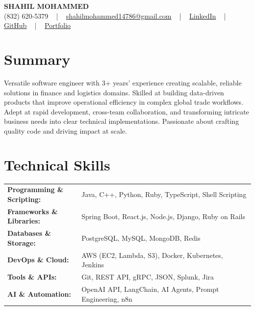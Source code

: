 \documentclass[letterpaper,11pt]{article}
\begin{document}
\begin{center}
    {\fontsize{14pt}{12pt}\selectfont \textbf{\MakeUppercase{Shahil Mohammed}}}\\ \vspace{2pt}
    \fontsize{10pt}{12pt}\selectfont (832) 620-5379 ~ | ~ \href{mailto:shahilmohammed14786@gmail.com}{shahilmohammed14786@gmail.com} ~ | ~  
    \href{https://www.linkedin.com/in/shahil-mohammed-9652931a1/}{\color{blue}\underline{LinkedIn}}  ~ | ~ 
    \href{https://github.com/freakbeast14}{\color{blue}\underline{GitHub}} ~ | ~ 
    \href{https://shahil-mohammed.netlify.app/}{\color{blue}\underline{Portfolio}}
    \vspace{-8pt}
\end{center}

\section{Summary}
\fontsize{9pt}{10pt}\selectfont
Versatile software engineer with 3+ years’ experience creating scalable, reliable solutions in finance and logistics domains. Skilled at building data-driven products that improve operational efficiency in complex global trade workflows. Adept at rapid development, cross-team collaboration, and transforming intricate business needs into clear technical implementations. Passionate about crafting quality code and driving impact at scale.

 \vspace{-5pt}
 
\section{Technical Skills}
        \vspace{-14pt}
        \begin{table}[h]
            \fontsize{9pt}{10pt}\selectfont
            \begin{tabular}{p{0.3\linewidth} p{0.7\linewidth}}
                \textbf{Programming \& Scripting:} & Java, C++, Python, Ruby, TypeScript, Shell Scripting \\
                \textbf{Frameworks \& Libraries:} & Spring Boot, React.js, Node.js, Django, Ruby on Rails \\
                \textbf{Databases \& Storage:} & PostgreSQL, MySQL, MongoDB, Redis \\
                \textbf{DevOps \& Cloud:} & AWS (EC2, Lambda, S3), Docker, Kubernetes, Jenkins \\
                \textbf{Tools \& APIs:} & Git, REST API, gRPC, JSON, Splunk, Jira \\
                \textbf{AI \& Automation:} & OpenAI API, LangChain, AI Agents, Prompt Engineering, n8n \\
            \end{tabular}
        \end{table}
 \vspace{-15pt}
 
\end{document}
